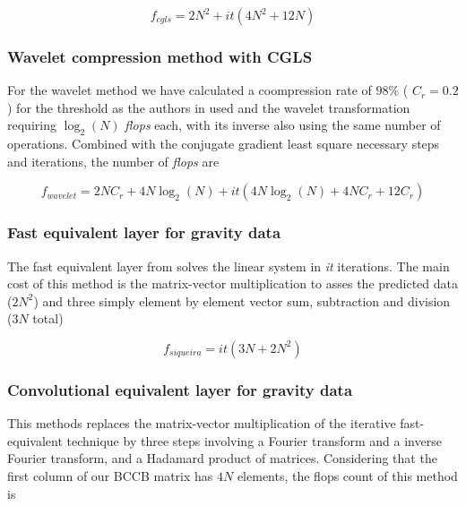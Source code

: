 \begin{equation}
	f_{cgls} = 2N^2 + it(4N^2 + 12N)
\label{cgls}
\end{equation}

\subsubsection{Wavelet compression method with CGLS \citep{li-oldenburg2010}}

For the wavelet method we have calculated a coompression rate of $98\%$ ( $C_r = 0.2$ ) for the threshold as the authors in \cite{li-oldenburg2010} used and the wavelet transformation requiring $\log_2(N)$ \textit{flops} each, with its inverse also using the same number of operations. Combined with the conjugate gradient least square necessary steps and iterations, the number of \textit{flops} are

\begin{equation}
	f_{wavelet} = 2NC_r + 4N\log_2(N) + it(4N\log_2(N) + 4NC_r + 12C_r)
\label{wavelet}
\end{equation}

\subsubsection{Fast equivalent layer for gravity data \citep{siqueira-etal2017}}

The fast equivalent layer from \cite{siqueira-etal2017} solves the linear system in \textit{it} iterations. The main cost of this method is the matrix-vector multiplication to asses the predicted data ($2N^2$) and three simply element by element vector sum, subtraction and division ($3N$ total)

\begin{equation}
	f_{siqueira} = it(3N +2N^2)
	\label{siqueira}
\end{equation}

\subsubsection{Convolutional equivalent layer for gravity data \citep{takahashi2020}}

This methods replaces the matrix-vector multiplication of the iterative fast-equivalent technique \citep{siqueira-etal2017} by three steps involving a Fourier transform and a inverse Fourier transform, 
and a Hadamard product of matrices. Considering that the first column of our BCCB matrix has $4N$ elements, the flops count of this method is

